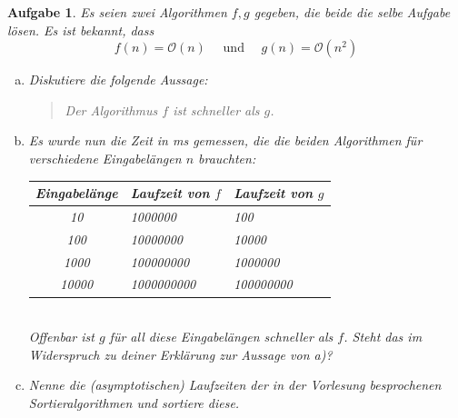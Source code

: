 \documentclass[a4paper,12pt,parskip=full]{scrartcl}
\theoremstyle{exercise}
\newtheorem{exercise}{Aufgabe}
\begin{document}
\begin{exercise}
Es seien zwei Algorithmen $f, g$ gegeben, die beide die
selbe Aufgabe lösen. Es ist bekannt, dass
$$ f(n) = \mathcal{O}(n) \quad \text{ und } \quad g(n) = \mathcal{O}(n^2)  $$
\begin{enumerate}[a)]
\item Diskutiere die folgende Aussage:
  \begin{quote}
    \emph{Der Algorithmus $f$ ist schneller als $g$.}
  \end{quote}

\item Es wurde nun die Zeit in ms gemessen, die die beiden Algorithmen für
  verschiedene Eingabelängen $n$ brauchten:
  \begin{table}[h!]
    \centering
    \begin{tabular}[h!]{c | l | l}
      Eingabelänge & Laufzeit von $f$ & Laufzeit von $g$ \\ \hline
      10    & 1000000    & 100  \\
      100   & 10000000   & 10000  \\
      1000  & 100000000  & 1000000  \\
      10000 & 1000000000 & 100000000  \\
    \end{tabular}
  \end{table}
  \\
  Offenbar ist $g$ für all diese Eingabelängen schneller als
  $f$. Steht das im Widerspruch zu deiner Erklärung zur Aussage von
  a)?

\item Nenne die (asymptotischen) Laufzeiten der in der Vorlesung besprochenen Sortieralgorithmen und
  sortiere diese. 
\end{enumerate}
\end{exercise}
\end{document}
